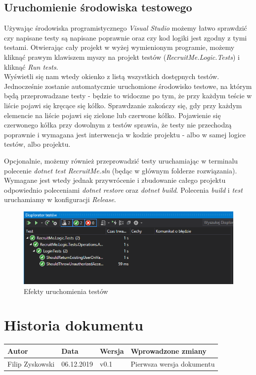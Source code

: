 \documentclass{article}
\begin{document}
\subsection{Uruchomienie środowiska testowego}

Używając środowiska programistycznego \emph{Visual Studio} możemy łatwo sprawdzić czy napisane testy są napisane poprawnie oraz czy kod logiki jest zgodny z tymi testami.
Otwierając cały projekt w wyżej wymienionym programie, możemy kliknąć prawym klawiszem myszy na projekt testów (\emph{RecruitMe.Logic.Tests}) i kliknąć \emph{Run tests}. \\
Wyświetli się nam wtedy okienko z listą wszystkich dostępnych testów. Jednocześnie zostanie automatycznie uruchomione środowisko testowe, na którym będą przeprowadzane testy - będzie to widoczne po tym, że przy każdym teście w liście pojawi się kręcące się kółko. Sprawdzanie zakończy się, gdy przy każdym elemencie na liście pojawi się zielone lub czerwone kółko. Pojawienie się czerwonego kółka przy dowolnym z testów sprawia, że testy nie przechodzą poprawnie i wymagana jest interwencja w kodzie projektu - albo w samej logice testów, albo projektu.

Opcjonalnie, możemy również przeprowadzić testy uruchamiając w terminalu polecenie \emph{dotnet test RecruitMe.sln} (będąc w głównym folderze rozwiązania). Wymagane jest wtedy jednak przywrócenie i zbudowanie całego projektu odpowiednio poleceniami \emph{dotnet restore} oraz \emph{dotnet build}. Polecenia \emph{build} i \emph{test} uruchamiamy w konfiguracji \emph{Release}.

\begin{figure}[H]
    \centering
    \includegraphics[width=1\linewidth]{images/runTest.png}
    \caption{Efekty uruchomienia testów}
    \label{fig:test3_label}
\end{figure}



\section{Historia dokumentu}

\begin{tabularx}{\linewidth}{|X|l|l|X|}
    \hline
    Autor & Data & Wersja & Wprowadzone zmiany \\
    \hline
    Filip Zyskowski & 06.12.2019 & v0.1 & Pierwsza wersja dokumentu \\
    \hline
\end{tabularx}
\end{document}
